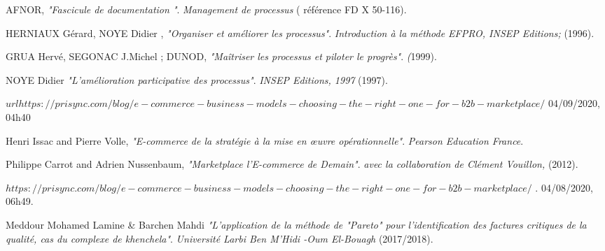
\begin{thebibliography}{99}
	\vspace{-2cm}
	AFNOR,
	\textit{"Fascicule de documentation "}. 
	\textit{Management de processus} ( référence FD X 50-116).
	
	 HERNIAUX Gérard, NOYE Didier ,
	\textit{"Organiser et améliorer les processus"}. 
	\textit{Introduction à la méthode EFPRO,  INSEP Editions;} (1996).

	
	GRUA Hervé, SEGONAC J.Michel ; DUNOD,
	\textit{"Maîtriser les processus et piloter le progrès"}. 
	\textit (1999).
	
	NOYE Didier
	\textit{"L'amélioration participative des processus"}.
	\textit{INSEP Editions, 1997} (1997). 
	
	\begin{math} url
		https://prisync.com/blog/e-commerce-business-models-choosing-the-right-one-for-b2b-marketplace/ 
	\end{math}
 04/09/2020, 04h40
	
	Henri Issac and Pierre Volle,
	\textit{"E-commerce de la stratégie à la mise en œuvre opérationnelle"}. 
	\textit{Pearson Education France}. 
	
	

	
	Philippe Carrot and Adrien Nussenbaum,
	\textit{"Marketplace l’E-commerce de Demain"}. 
	\textit{avec la collaboration de Clément Vouillon,} (2012).
	
	\begin{math}
	 https://prisync.com/blog/e-commerce-business-models-choosing-the-right-one-for-b2b-marketplace/
	\end{math}	
		. 	04/08/2020, 06h49.
		
	Meddour Mohamed Lamine \& Barchen Mahdi
	\textit{"L’application de la méthode de "Pareto" pour l'identification des factures critiques de la qualité, cas du complexe de khenchela"}. 
	\textit{Université Larbi Ben M’Hidi -Oum El-Bouagh} (2017/2018).
		

\end{thebibliography}
